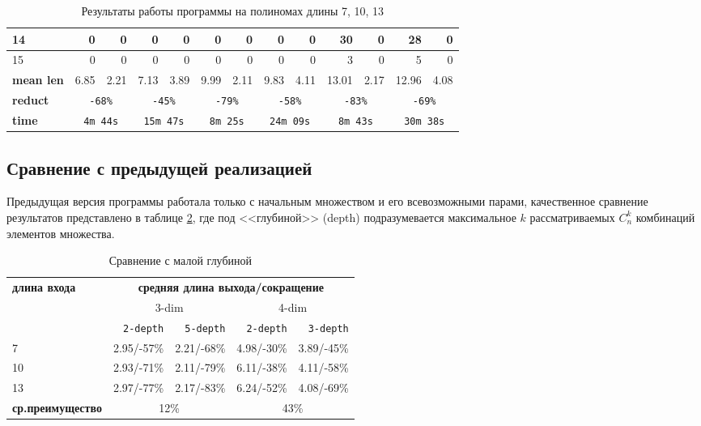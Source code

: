 \documentclass[a4paper,12pt,titlepage]{article}
\begin{document}
\begin{table}[h!]
\begin{tabular}{ |l||r|r||r|r||r|r||r|r||r|r||r|r| }
14  & 0     & 0     & 0     & 0     & 0     & 0     & 0     & 0     & 30    & 0     & 28    & 0     \\ \hline
15  & 0     & 0     & 0     & 0     & 0     & 0     & 0     & 0     & 3     & 0     & 5     & 0     \\ \hline \hline
\textbf{mean len}   & 6.85  & 2.21  & 7.13  & 3.89  & 9.99  & 2.11  & 9.83  & 4.11  & 13.01 & 2.17  & 12.96 & 4.08  \\ \hline
\textbf{reduct}  & \multicolumn{2}{c||}{\tt -68\%}  & \multicolumn{2}{c||}{\tt -45\%} & \multicolumn{2}{c||}{\tt -79\%}  & \multicolumn{2}{c||}{\tt -58\%}   & \multicolumn{2}{c||}{\tt -83\%}  & \multicolumn{2}{c|}{\tt -69\%} \\ \hline
\textbf{time}       & \multicolumn{2}{c||}{\tt 4m 44s}  & \multicolumn{2}{c||}{\tt 15m 47s} & \multicolumn{2}{c||}{\tt 8m 25s}  & \multicolumn{2}{c||}{\tt 24m 09s}  & \multicolumn{2}{c||}{\tt 8m 43s}  & \multicolumn{2}{c|}{\tt 30m 38s}  \\ \hline
\end{tabular}
\caption{Результаты работы программы на полиномах длины 7, 10, 13}
\label{table_results}
\end{table}

\subsection{Сравнение с предыдущей реализацией}

Предыдущая версия программы работала только с начальным множеством и его всевозможными парами, качественное сравнение результатов представлено в таблице \ref{table_comparison}, где под <<глубиной>> (depth) подразумевается максимальное $ k $ рассматриваемых $ C_n^k $ комбинаций элементов множества.

\begin{table}[h!]
\centering
\begin{tabular}{ |l||r|r||r|r|} \hline
\multirow{3}{*}{\bf длина входа} & \multicolumn{4}{c|}{\bf средняя длина выхода/сокращение} \\ \cline{2-5}
    & \multicolumn{2}{c||}{3-dim} & \multicolumn{2}{c|}{4-dim} \\ \cline{2-5}
    & \texttt{2-depth} & \texttt{5-depth} & \texttt{2-depth} & \texttt{3-depth} \\ \hline \hline
7   & 2.95/-57\%  & 2.21/-68\%  & 4.98/-30\%  & 3.89/-45\%  \\ \hline
10  & 2.93/-71\%  & 2.11/-79\%  & 6.11/-38\%  & 4.11/-58\%  \\ \hline
13  & 2.97/-77\%  & 2.17/-83\%  & 6.24/-52\%  & 4.08/-69\%  \\ \hline \hline
\textbf{ср.преимущество}    & \multicolumn{2}{c||}{12\%}  & \multicolumn{2}{c|}{43\%}   \\ \hline
\end{tabular}
\caption{Сравнение с малой глубиной}
\label{table_comparison}
\end{table}
\end{document}
